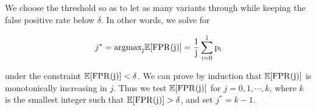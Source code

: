 \documentclass[nofootinbib,amssymb,amsmath]{revtex4}
\begin{document}
We choose the threshold so as to let as many variants through while keeping the false positive rate below $\delta$. In other words, we solve for

\begin{equation}
j^* = \rm{argmax}_j \mathbb{E} [ \rm{FPR}(j)]= \frac{1}{j} \sum_{i = 0}^{j} p_i
\end{equation}

under the constraint $ \mathbb{E} [ \rm{FPR}(j)] < \delta$. We can prove by induction that $\mathbb{E} [ \rm{FPR}(j)]$ is monotonically increasing in $j$. Thus we test $\mathbb{E} [ \rm{FPR}(j)]$ for $j = 0, 1, \cdots, k$, where $k$ is the smallest integer such that $\mathbb{E} [ \rm{FPR}(j)] > \delta$, and set $j^* = k-1$. 
\end{document}
